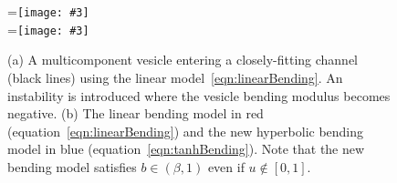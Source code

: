 \documentclass[twoside,twocolumn,9pt]{article}
\newcommand{\subfigimg}[3][,]{%
  \setbox1=\hbox{\texttt{[image: \#3]}}%
  \leavevmode\rlap{\usebox1}%
  \rlap{\hspace*{0pt}\raisebox{\dimexpr\ht1-0\baselineskip}{\bf
  \normalsize #2}}%
  \phantom{\usebox1}%
}
\begin{document}
\begin{figure}[H]
  \centering
  \subfigimg[width=0.9\linewidth, clip ]{(a)}{figures/OldBending.pdf} \\
  \subfigimg[width=0.9\linewidth, clip ]{(b)}{figures/concModels.pdf}
  \caption{\label{fig:concModels} \small (a) A multicomponent vesicle
  entering a closely-fitting channel (black lines) using the linear
  model~\eqref{eqn:linearBending}. An instability is introduced where
  the vesicle bending modulus becomes negative. (b) The linear bending
  model in red (equation~\eqref{eqn:linearBending}) and the new
  hyperbolic bending model in blue (equation~\eqref{eqn:tanhBending}).
  Note that the new bending model satisfies $b \in (\beta,1)$ even if $u
  \notin [0,1]$.}
\end{figure}





\end{document}
